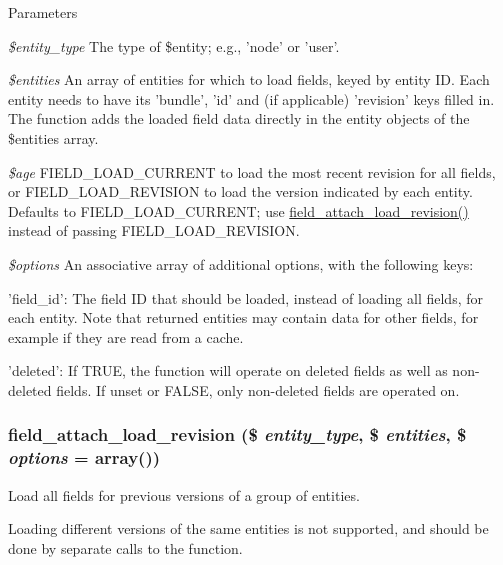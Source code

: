 \begin{DoxyParams}{Parameters}
\item[{\em \$entity\_\-type}]The type of \$entity; e.g., 'node' or 'user'. \item[{\em \$entities}]An array of entities for which to load fields, keyed by entity ID. Each entity needs to have its 'bundle', 'id' and (if applicable) 'revision' keys filled in. The function adds the loaded field data directly in the entity objects of the \$entities array. \item[{\em \$age}]FIELD\_\-LOAD\_\-CURRENT to load the most recent revision for all fields, or FIELD\_\-LOAD\_\-REVISION to load the version indicated by each entity. Defaults to FIELD\_\-LOAD\_\-CURRENT; use \hyperlink{group__field__attach_gac79dd0f29910835c653b068233fa429b}{field\_\-attach\_\-load\_\-revision()} instead of passing FIELD\_\-LOAD\_\-REVISION. \item[{\em \$options}]An associative array of additional options, with the following keys:
\begin{DoxyItemize}
\item 'field\_\-id': The field ID that should be loaded, instead of loading all fields, for each entity. Note that returned entities may contain data for other fields, for example if they are read from a cache.
\item 'deleted': If TRUE, the function will operate on deleted fields as well as non-\/deleted fields. If unset or FALSE, only non-\/deleted fields are operated on. 
\end{DoxyItemize}\end{DoxyParams}
\hypertarget{group__field__attach_gac79dd0f29910835c653b068233fa429b}{
\subsubsection[{field\_\-attach\_\-load\_\-revision}]{\setlength{\rightskip}{0pt plus 5cm}field\_\-attach\_\-load\_\-revision (\$ {\em entity\_\-type}, \/  \$ {\em entities}, \/  \$ {\em options} = {\ttfamily array()})}}
\label{group__field__attach_gac79dd0f29910835c653b068233fa429b}
Load all fields for previous versions of a group of entities.

Loading different versions of the same entities is not supported, and should be done by separate calls to the function.

